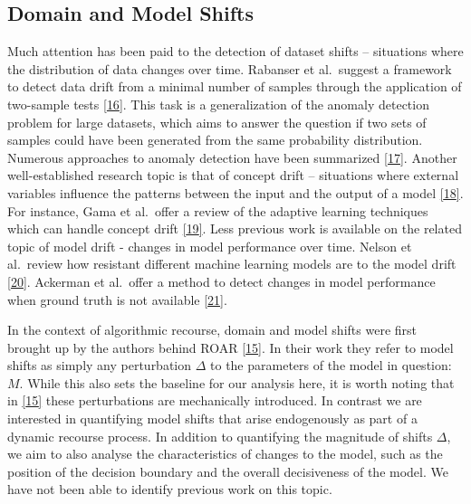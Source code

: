 \documentclass[
  conference]{IEEEtran}
\begin{document}
\hypertarget{sec-related-shifts}{%
\subsection{Domain and Model Shifts}\label{sec-related-shifts}}

Much attention has been paid to the detection of dataset shifts --
situations where the distribution of data changes over time. Rabanser et
al.~suggest a framework to detect data drift from a minimal number of
samples through the application of two-sample tests
\protect\hyperlink{ref-rabanser2019failing}{{[}16{]}}. This task is a
generalization of the anomaly detection problem for large datasets,
which aims to answer the question if two sets of samples could have been
generated from the same probability distribution. Numerous approaches to
anomaly detection have been summarized
\protect\hyperlink{ref-chandola2009anomaly}{{[}17{]}}. Another
well-established research topic is that of concept drift -- situations
where external variables influence the patterns between the input and
the output of a model
\protect\hyperlink{ref-widmer1996learning}{{[}18{]}}. For instance, Gama
et al.~offer a review of the adaptive learning techniques which can
handle concept drift \protect\hyperlink{ref-gama2014survey}{{[}19{]}}.
Less previous work is available on the related topic of model drift -
changes in model performance over time. Nelson et al.~review how
resistant different machine learning models are to the model drift
\protect\hyperlink{ref-nelson2015evaluating}{{[}20{]}}. Ackerman et
al.~offer a method to detect changes in model performance when ground
truth is not available
\protect\hyperlink{ref-ackerman2021machine}{{[}21{]}}.

In the context of algorithmic recourse, domain and model shifts were
first brought up by the authors behind ROAR
\protect\hyperlink{ref-upadhyay2021towards}{{[}15{]}}. In their work
they refer to model shifts as simply any perturbation \(\Delta\) to the
parameters of the model in question: \(M\). While this also sets the
baseline for our analysis here, it is worth noting that in
\protect\hyperlink{ref-upadhyay2021towards}{{[}15{]}} these
perturbations are mechanically introduced. In contrast we are interested
in quantifying model shifts that arise endogenously as part of a dynamic
recourse process. In addition to quantifying the magnitude of shifts
\(\Delta\), we aim to also analyse the characteristics of changes to the
model, such as the position of the decision boundary and the overall
decisiveness of the model. We have not been able to identify previous
work on this topic.
\end{document}
